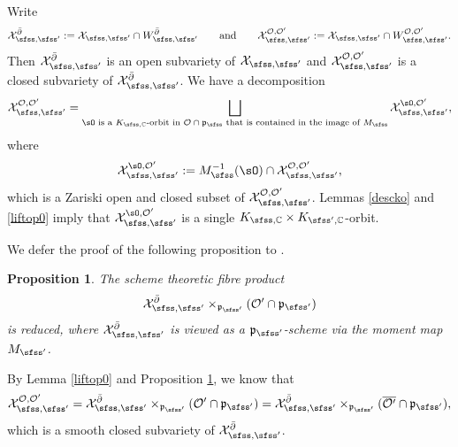 \documentclass[12pt,a4paper]{amsart}
\newcommand{\CO}{{\mathcal {O}}}
\newcommand{\CX}{{\mathcal {X}}}
\newcommand{\p}{\mathfrak p}
\newcommand{\be}{\begin {equation}}
\newcommand{\ee}{\end {equation}}
\numberwithin{equation}{section}
\newtheorem{prop}[thm]{Proposition}
\theoremstyle{remark}
\begin{document}
Write 
\[
    \CX_{\sfss, \sfss'}^{\bar \partial}:=\CX_{\sfss, \sfss'} \cap W_{\sfss, \sfss'}^{\bar \partial}\qquad\textrm{and}\qquad \CX_{\sfss, \sfss'}^{\CO, \CO'}:=\CX_{\sfss, \sfss'} \cap W_{\sfss, \sfss'}^{\CO, \CO'}.
   \]
Then  $ \CX_{\sfss, \sfss'}^{\bar \partial}$ is an open subvariety of $ \CX_{\sfss, \sfss'}$ and  $\CX_{\sfss, \sfss'}^{\CO, \CO'}$ is a  closed subvariety of  $\CX_{\sfss, \sfss'}^{\bar \partial}$. We have a decomposition
 \[
   \CX_{\sfss, \sfss'}^{\CO, \CO'}=\bigsqcup_{\sO\textrm{ is a   $K_{\sfss, \C}$-orbit in $ \CO\cap \p_\sfss$ that is contained in the image of $M_\sfss$}}  \CX_{\sfss, \sfss'}^{\sO, \CO'},
 \]
 where 
 \[
   \CX_{\sfss, \sfss'}^{\sO, \CO'}:=M_\sfss^{-1}(\sO)\cap \CX_{\sfss, \sfss'}^{\CO, \CO'}, 
 \]
 which is a Zariski open and closed subset of $\CX_{\sfss, \sfss'}^{\CO, \CO'}$. Lemmas \ref{descko} and \ref{liftop0} imply that $ \CX_{\sfss, \sfss'}^{\sO, \CO'}$ is a single $K_{\sfss, \C}\times K_{\sfss',\C}$-orbit. 
 
We defer the proof of the following proposition to .
\begin{prop}\label{propreduced}
 The scheme theoretic  fibre product 
\[
\CX_{\sfss, \sfss'}^{\bar \partial}\times_{\p_{\sfss'}} ({\CO'}\cap \p_{\sfss'})
\]
is reduced, where $\CX_{\sfss, \sfss'}^{\bar \partial}$ is viewed as a $\p_{\sfss'}$-scheme via the moment map $M_{\sfss'}$. 
\end{prop}


By Lemma \ref{liftop0} and Proposition \ref{propreduced}, we know that 
\be\label{cxee}
 \CX_{\sfss, \sfss'}^{\CO, \CO'}=\CX_{\sfss, \sfss'}^{\bar \partial}\times_{\p_{\sfss'}} ({\CO'}\cap \p_{\sfss'})=\CX_{\sfss, \sfss'}^{\bar \partial}\times_{\p_{\sfss'}} ({\overline{\CO'}}\cap \p_{\sfss'}),
 \ee
 which  is a smooth closed subvariety of $\CX_{\sfss, \sfss'}^{\bar \partial}$. 
\end{document}
